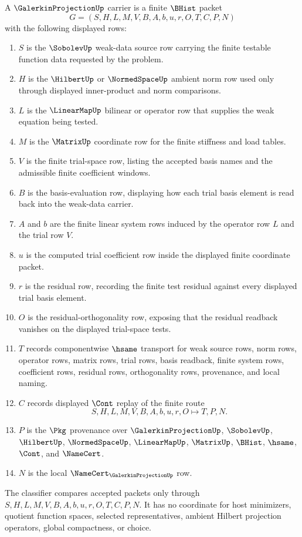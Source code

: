 \begin{definition}
\label{def:galerkin-projection-carrier}
A $\GalerkinProjectionUp$ carrier is a finite $\BHist$ packet
$$
G=(S,H,L,M,V,B,A,b,u,r,O,T,C,P,N)
$$
with the following displayed rows:
\begin{enumerate}
\item $S$ is the $\SobolevUp$ weak-data source row carrying the finite testable function data requested by the problem.
\item $H$ is the $\HilbertUp$ or $\NormedSpaceUp$ ambient norm row used only through displayed inner-product and norm comparisons.
\item $L$ is the $\LinearMapUp$ bilinear or operator row that supplies the weak equation being tested.
\item $M$ is the $\MatrixUp$ coordinate row for the finite stiffness and load tables.
\item $V$ is the finite trial-space row, listing the accepted basis names and the admissible finite coefficient windows.
\item $B$ is the basis-evaluation row, displaying how each trial basis element is read back into the weak-data carrier.
\item $A$ and $b$ are the finite linear system rows induced by the operator row $L$ and the trial row $V$.
\item $u$ is the computed trial coefficient row inside the displayed finite coordinate packet.
\item $r$ is the residual row, recording the finite test residual against every displayed trial basis element.
\item $O$ is the residual-orthogonality row, exposing that the residual readback vanishes on the displayed trial-space tests.
\item $T$ records componentwise $\hsame$ transport for weak source rows, norm rows, operator rows, matrix rows, trial rows, basis readback, finite system rows, coefficient rows, residual rows, orthogonality rows, provenance, and local naming.
\item $C$ records displayed $\Cont$ replay of the finite route
$$
S,H,L,M,V,B,A,b,u,r,O \longmapsto T,P,N .
$$
\item $P$ is the $\Pkg$ provenance over $\GalerkinProjectionUp$, $\SobolevUp$, $\HilbertUp$, $\NormedSpaceUp$, $\LinearMapUp$, $\MatrixUp$, $\BHist$, $\hsame$, $\Cont$, and $\NameCert$.
\item $N$ is the local $\NameCert_{\GalerkinProjectionUp}$ row.
\end{enumerate}
The classifier compares accepted packets only through $S,H,L,M,V,B,A,b,u,r,O,T,C,P,N$. It has no coordinate for host minimizers, quotient function spaces, selected representatives, ambient Hilbert projection operators, global compactness, or choice.
\end{definition}

